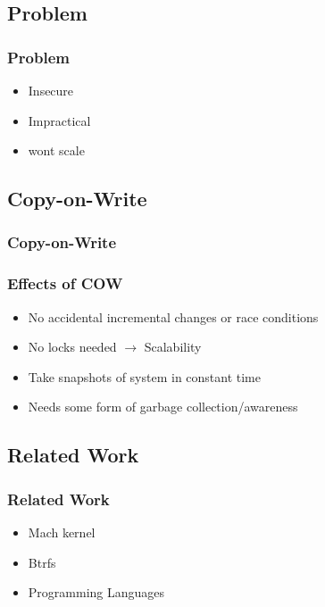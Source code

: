 \documentclass{beamer}
\begin{document}
\subsection{Problem}
\begin{frame}
  \frametitle{Problem}
  \begin{itemize}
    \item{Insecure} %
    \pause
    \item{Impractical} %
    \pause
    \item{wont scale} %
  \end{itemize}
\end{frame}

\subsection{Copy-on-Write}
\begin{frame}
  \frametitle{Copy-on-Write}
  \centerline{}
\end{frame}

\begin{frame}
  \frametitle{Effects of COW}
  \begin{itemize}
    \item{No accidental incremental changes or race conditions}
    \pause
    \item{No locks needed $\rightarrow$ Scalability}
    \pause
    \item{Take snapshots of system in constant time}
    \pause
    \item{Needs some form of garbage collection/awareness}
   \end{itemize}
\end{frame}

\subsection{Related Work}
\begin{frame}
  \frametitle{Related Work}
  \begin{itemize}
    \item{Mach kernel}
    \pause
    \item{Btrfs}
    \pause
    \item{Programming Languages}
  \end{itemize}
\end{frame}
\end{document}
